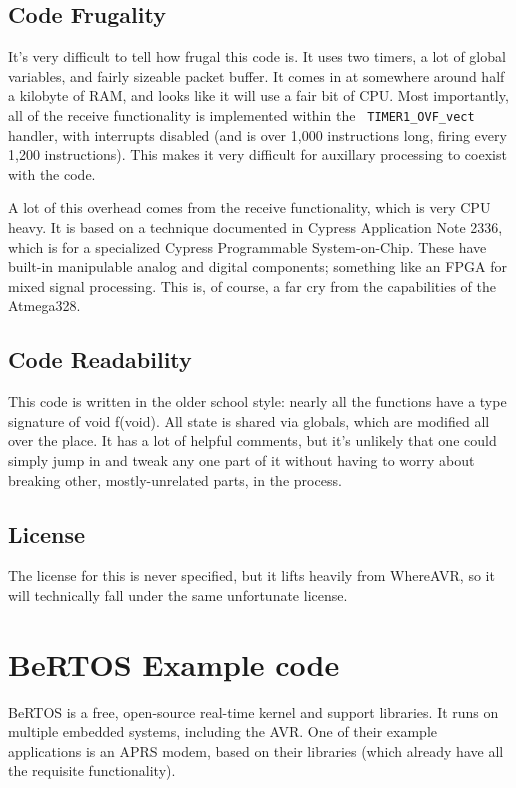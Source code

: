 \subsection{Code Frugality}

It's very difficult to tell how frugal this code is.  It uses two
timers, a lot of global variables, and fairly sizeable packet buffer.
It comes in at somewhere around half a kilobyte of RAM, and looks like
it will use a fair bit of CPU.  Most importantly, all of the receive
functionality is implemented within the \texttt{ TIMER1\_OVF\_vect }
handler, with interrupts disabled (and is over 1,000 instructions
long, firing every 1,200 instructions).  This makes it very difficult
for auxillary processing to coexist with the code.

A lot of this overhead comes from the receive functionality, which is
very CPU heavy.  It is based on a technique documented in Cypress
Application Note 2336\cite{cypress2336},  which is for a specialized
Cypress Programmable System-on-Chip.  These have built-in manipulable
analog and digital components; something like an FPGA for mixed signal
processing.  This is, of course, a far cry from the capabilities of
the Atmega328.

\subsection{Code Readability}

This code is written in the older school style: nearly all the
functions have a type signature of void f(void).  All state is shared
via globals, which are modified all over the place.  It has a lot of
helpful comments, but it's unlikely that one could simply jump in and
tweak any one part of it without having to worry about breaking other,
mostly-unrelated parts, in the process.


\subsection{License}

The license for this is never specified, but it lifts heavily from
WhereAVR, so it will technically fall under the same unfortunate
license.

\section{BeRTOS Example code}

BeRTOS\cite{BeRTOS} is a free, open-source real-time kernel and
support libraries.  It runs on multiple embedded systems, including
the AVR.  One of their example applications\cite{BeRTOSAPRS} is an APRS modem, based on
their libraries (which already have all the requisite functionality).

